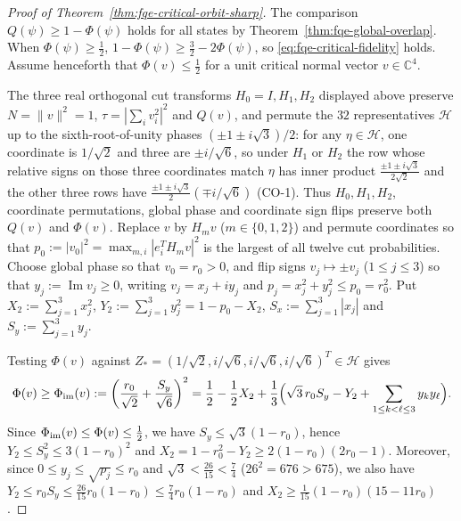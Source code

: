 \begin{proof}[Proof of Theorem~\ref{thm:fqe-critical-orbit-sharp}]
The comparison $Q(\psi)\ge1-\Phi(\psi)$ holds for all states by
Theorem~\ref{thm:fqe-global-overlap}. When $\Phi(\psi)\ge\tfrac12$,
$1-\Phi(\psi)\ge\tfrac32-2\Phi(\psi)$, so \eqref{eq:fqe-critical-fidelity}
holds. Assume henceforth that $\Phi(v)\le\tfrac12$ for a unit critical
normal vector $v\in\mathbb C^4$.

The three real orthogonal cut transforms $H_0=I,H_1,H_2$ displayed above
preserve $N=\|v\|^2=1$, $\tau=|\sum_i v_i^2|^2$ and $Q(v)$, and permute
the $32$ representatives $\mathcal H$ up to the sixth-root-of-unity
phases $(\pm1\pm i\sqrt3)/2$: for any $\eta\in\mathcal H$, one coordinate
is $1/\sqrt2$ and three are $\pm i/\sqrt6$, so under $H_1$ or $H_2$ the
row whose relative signs on those three coordinates match $\eta$ has inner
product $\frac{\pm1\pm i\sqrt3}{2\sqrt2}$ and the other three rows have
$\frac{\pm1\pm i\sqrt3}{2}(\mp i/\sqrt6)$ (CO-1). Thus $H_0,H_1,H_2$,
coordinate permutations, global phase and coordinate sign flips preserve
both $Q(v)$ and $\Phi(v)$. Replace $v$ by $H_mv$ ($m\in\{0,1,2\}$) and
permute coordinates so that
$p_0:=|v_0|^2=\max_{m,i}|e_i^TH_mv|^2$ is the largest of all twelve cut
probabilities. Choose global phase so that $v_0=r_0>0$, and flip signs
$v_j\mapsto\pm v_j$ ($1\le j\le3$) so that $y_j:=\operatorname{Im}v_j\ge0$,
writing $v_j=x_j+iy_j$ and $p_j=x_j^2+y_j^2\le p_0=r_0^2$. Put
$X_2:=\sum_{j=1}^3x_j^2$, $Y_2:=\sum_{j=1}^3y_j^2=1-p_0-X_2$,
$S_x:=\sum_{j=1}^3|x_j|$ and $S_y:=\sum_{j=1}^3y_j$.

Testing $\Phi(v)$ against
$Z_*=(1/\sqrt2,i/\sqrt6,i/\sqrt6,i/\sqrt6)^T\in\mathcal H$ gives
\[
 \Phi(v)\ge\Phi_{\rm im}(v):=\left(\frac{r_0}{\sqrt2}+\frac{S_y}{\sqrt6}\right)^2
 =\frac12-\frac12X_2+\frac13\Bigl(\sqrt3\,r_0S_y-Y_2+\sum_{1\le k<\ell\le3}y_ky_\ell\Bigr).
\]
Since $\Phi_{\rm im}(v)\le\Phi(v)\le\tfrac12$, we have
$S_y\le\sqrt3(1-r_0)$, hence $Y_2\le S_y^2\le3(1-r_0)^2$ and
$X_2=1-r_0^2-Y_2\ge2(1-r_0)(2r_0-1)$. Moreover, since
$0\le y_j\le\sqrt{p_j}\le r_0$ and $\sqrt3<\tfrac{26}{15}<\tfrac74$
($26^2=676>675$), we also have
$Y_2\le r_0S_y\le\tfrac{26}{15}r_0(1-r_0)\le\tfrac74r_0(1-r_0)$ and
$X_2\ge\tfrac1{15}(1-r_0)(15-11r_0)$.


\end{proof}
